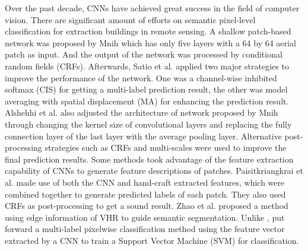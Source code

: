 Over the past decade, CNNs have achieved great success in the field of computer vision. 
There are significant amount of efforts on semantic pixel-level classification for extraction buildings in remote sensing. 
A shallow patch-based network was proposed by Mnih \cite{IEEEexample:mnih2013machine} which has only five layers with a 64 by 64 aerial patch as input. 
And the output of the network was processed by conditional random fields (CRFs). 
Afterwards, Satio et al. \cite{IEEEexample:saito2016multiple} applied two major strategies to improve the performance of the network. 
One was a channel-wise inhibited softmax (CIS) for getting a multi-label prediction result, the other was model averaging with spatial displacement (MA) for enhancing the prediction result. Alshehhi et al. \cite{IEEEexample:alshehhi2017simultaneous} also adjusted the architecture of network proposed by Mnih through changing the kernel size of convolutional layers and replacing the fully connection layer of the last layer with the average pooling layer. Alternative post-processing strategies such as CRFs and multi-scales were used to improve the final prediction results. Some methods took advantage of the feature extraction capability of CNNs to generate feature descriptions of patches. Paisitkriangkrai et al. \cite{IEEEexample:paisitkriangkrai2015effective} made use of both the CNN and hand-craft extracted features, which were combined together to generate predicted labels of each patch. They also used CRFs as post-processing to get a sound result. Zhao et al. \cite{IEEEexample:zhao2017contextually} proposed a method using edge information of VHR to guide semantic segmentation. Unlike \cite{IEEEexample:paisitkriangkrai2015effective}, \cite{IEEEexample:he2017multi} put forward a multi-label pixelwise classification method using the feature vector extracted by a CNN to train a Support Vector Machine (SVM) for classification.



